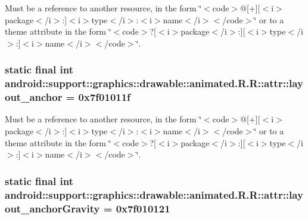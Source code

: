 Must be a reference to another resource, in the form \char`\"{}$<$code$>$@\mbox{[}+\mbox{]}\mbox{[}$<$i$>$package$<$/i$>$:\mbox{]}$<$i$>$type$<$/i$>$:$<$i$>$name$<$/i$>$$<$/code$>$\char`\"{} or to a theme attribute in the form \char`\"{}$<$code$>$?\mbox{[}$<$i$>$package$<$/i$>$:\mbox{]}\mbox{[}$<$i$>$type$<$/i$>$:\mbox{]}$<$i$>$name$<$/i$>$$<$/code$>$\char`\"{}. \hypertarget{classandroid_1_1support_1_1graphics_1_1drawable_1_1animated_1_1_r_1_1attr_ae8cb52abaac96f29547338f0ee687ae}{
\subsubsection[{layout\_\-anchor}]{\setlength{\rightskip}{0pt plus 5cm}static final int android::support::graphics::drawable::animated.R.R::attr::layout\_\-anchor = 0x7f01011f}}
\label{classandroid_1_1support_1_1graphics_1_1drawable_1_1animated_1_1_r_1_1attr_ae8cb52abaac96f29547338f0ee687ae}


Must be a reference to another resource, in the form \char`\"{}$<$code$>$@\mbox{[}+\mbox{]}\mbox{[}$<$i$>$package$<$/i$>$:\mbox{]}$<$i$>$type$<$/i$>$:$<$i$>$name$<$/i$>$$<$/code$>$\char`\"{} or to a theme attribute in the form \char`\"{}$<$code$>$?\mbox{[}$<$i$>$package$<$/i$>$:\mbox{]}\mbox{[}$<$i$>$type$<$/i$>$:\mbox{]}$<$i$>$name$<$/i$>$$<$/code$>$\char`\"{}. \hypertarget{classandroid_1_1support_1_1graphics_1_1drawable_1_1animated_1_1_r_1_1attr_846f340c02cf9ae1a17f20d930847508}{
\subsubsection[{layout\_\-anchorGravity}]{\setlength{\rightskip}{0pt plus 5cm}static final int android::support::graphics::drawable::animated.R.R::attr::layout\_\-anchorGravity = 0x7f010121}}
\label{classandroid_1_1support_1_1graphics_1_1drawable_1_1animated_1_1_r_1_1attr_846f340c02cf9ae1a17f20d930847508}


